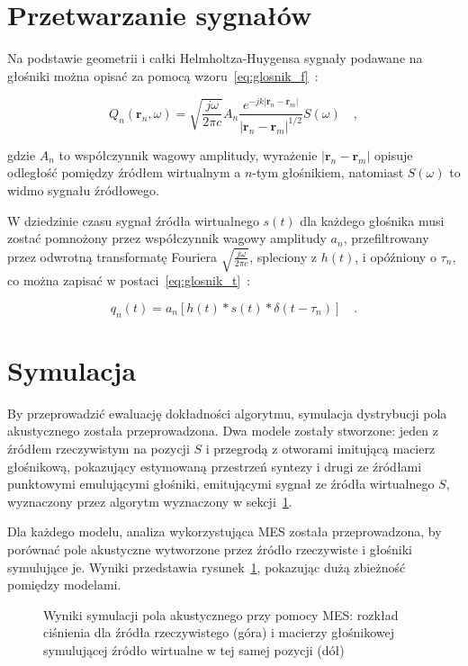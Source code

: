 \documentclass[12pt]{oska}
\let\Oldsection\section
\renewcommand{\section}{\FloatBarrier\Oldsection}
\begin{document}
\section{Przetwarzanie sygnałów}\label{s:algorithm}

Na podstawie geometrii i całki Helmholtza-Huygensa 
sygnały podawane na głośniki można opisać za pomocą
wzoru~\eqref{eq:glosnik_f}~\cite{delay}:

\begin{equation}
  Q_n(\bm{r}_n,\omega) = \sqrt{\frac{j\omega}{2\pi c}} A_n \frac {e^{-jk|\bm{r}_n-\bm{r}_m|}}{|\bm{r}_n-\bm{r}_m|^{1/2}} S(\omega) \quad,
  \label{eq:glosnik_f}
\end{equation}

gdzie $A_n$ to współczynnik wagowy amplitudy, wyrażenie
$|\bm{r}_n-\bm{r}_m|$ opisuje odległość pomiędzy źródłem wirtualnym
a $n$-tym głośnikiem, natomiast $S(\omega)$ to widmo sygnału źródłowego.

W dziedzinie czasu sygnał źródła wirtualnego $s(t)$ dla każdego głośnika musi zostać pomnożony
przez współczynnik wagowy amplitudy $a_n$, przefiltrowany przez odwrotną
transformatę Fouriera $\sqrt{\frac{j\omega}{2\pi c}}$, spleciony z $h(t)$, i
opóźniony o $\tau_n$, co można zapisać w postaci~\eqref{eq:glosnik_t}~\cite{enhancement}:

\begin{equation}
  q_n(t) = a_n\left[h(t)*s(t)*\delta(t-\tau_n)\right] \quad. \label{eq:glosnik_t}
\end{equation}

\section{Symulacja}

By przeprowadzić ewaluację dokładności algorytmu, symulacja dystrybucji pola
akustycznego została przeprowadzona. Dwa modele zostały stworzone: jeden z
źródłem rzeczywistym na pozycji $S$ i przegrodą z otworami imitującą macierz
głośnikową, pokazujący estymowaną przestrzeń syntezy i drugi ze źródłami
punktowymi emulującymi głośniki, emitującymi sygnał ze źródła wirtualnego $S$,
wyznaczony przez algorytm wyznaczony w sekcji~\ref{s:algorithm}.

Dla każdego modelu, analiza wykorzystująca MES została przeprowadzona, by
porównać pole akustyczne wytworzone przez źródło rzeczywiste i głośniki
symulujące je. Wyniki przedstawia rysunek~\ref{r:fem}, pokazując dużą zbieżność
pomiędzy modelami.

\begin{figure}[!tbh]
  \centering
  \caption{Wyniki symulacji pola akustycznego przy pomocy MES:
    rozkład ciśnienia dla źródła rzeczywistego (góra) i macierzy głośnikowej
  symulującej źródło wirtualne w tej samej pozycji (dół)}
  \label{r:fem}
\end{figure}
\end{document}
